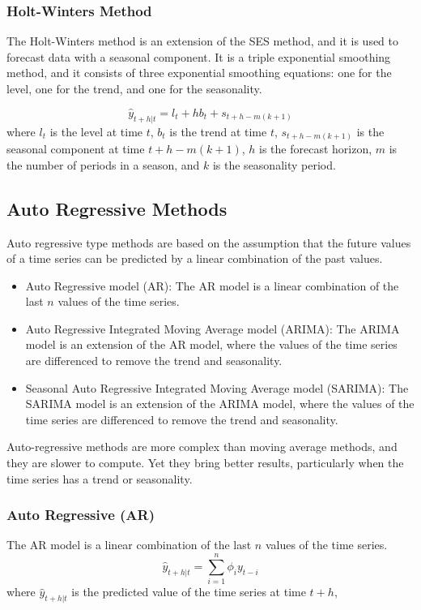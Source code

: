 \documentclass[manuscript,screen,nonacm,11pt]{acmart}                                                          %
\numberwithin{equation}{section}
\begin{document}
\subsubsection{Holt-Winters Method}
The Holt-Winters method is an extension of the SES method, and it is used to forecast
data with a seasonal component. It is a triple exponential smoothing method, and it
consists of three exponential smoothing equations: one for the level, one for the trend,
and one for the seasonality.

\begin{equation}
\label{eq:hw}
\hat{y}_{t+h|t} = l_t + hb_t + s_{t+h-m(k+1)}
\end{equation}
where $l_t$ is the level at time $t$, $b_t$ is the trend at time $t$, $s_{t+h-m(k+1)}$ is the seasonal component at time $t+h-m(k+1)$, $h$ is the forecast horizon, $m$ is the number of periods in a season, and $k$ is the seasonality period.




\subsection{Auto Regressive Methods}
Auto regressive type methods are based on the assumption that the future values of a time series can be predicted by a linear combination of the past values.

\begin{itemize}
	\item Auto Regressive model (AR): The AR model is a linear combination of the last $n$ values of the time series.
	\item Auto Regressive Integrated Moving Average model (ARIMA): The ARIMA model is an extension of the AR model, where the values of the time series are differenced to remove the trend and seasonality.
	\item Seasonal Auto Regressive Integrated Moving Average model (SARIMA): The SARIMA model is an extension of the ARIMA model, where the values of the time series are differenced to remove the trend and seasonality.
\end{itemize}

Auto-regressive methods are more complex than moving average methods, and they are slower to compute. Yet they bring better results, particularly when the time series has a trend or seasonality.


\subsubsection{Auto Regressive (AR)}
The AR model is a linear combination of the last $n$ values of the time series.
\begin{equation}
\label{eq:ar}
\hat{y}_{t+h|t} = \sum_{i=1}^n \phi_i y_{t-i}
\end{equation}
where $\hat{y}_{t+h|t}$ is the predicted value of the time series at time $t+h$,
\end{document}
